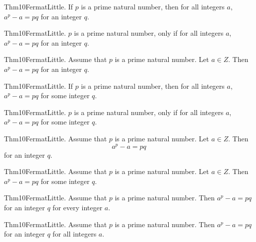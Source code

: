 \documentclass{article}
\begin{document}
Thm10FermatLittle. If $p$ is a prime natural number, then for all integers $a$, $a ^ {p}- a = p q$ for an integer $q$.

Thm10FermatLittle. $p$ is a prime natural number, only if for all integers $a$, $a ^ {p}- a = p q$ for an integer $q$.

Thm10FermatLittle. Assume that $p$ is a prime natural number. Let $a \in Z$. Then $a ^ {p}- a = p q$ for an integer $q$.

Thm10FermatLittle. If $p$ is a prime natural number, then for all integers $a$, $a ^ {p}- a = p q$ for some integer $q$.

Thm10FermatLittle. $p$ is a prime natural number, only if for all integers $a$, $a ^ {p}- a = p q$ for some integer $q$.

Thm10FermatLittle. Assume that $p$ is a prime natural number. Let $a \in Z$. Then $$a ^ {p}- a = p q$$ for an integer $q$.

Thm10FermatLittle. Assume that $p$ is a prime natural number. Let $a \in Z$. Then $a ^ {p}- a = p q$ for some integer $q$.

Thm10FermatLittle. Assume that $p$ is a prime natural number. Then $a ^ {p}- a = p q$ for an integer $q$ for every integer $a$.

Thm10FermatLittle. Assume that $p$ is a prime natural number. Then $a ^ {p}- a = p q$ for an integer $q$ for all integers $a$.
\end{document}
